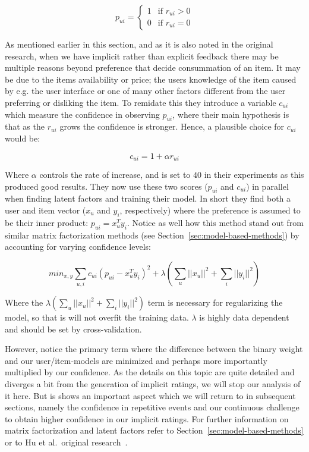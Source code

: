 \begin{equation}
  p_{ui} =
  \begin{cases}
    1 & \text{if $r_{ui} > 0$} \\
    0 & \text{if $r_{ui} = 0$}
  \end{cases}
\end{equation}

As mentioned earlier in this section, and as it is also noted in the original
research, when we have implicit rather than explicit feedback there may be
multiple reasons beyond preference that decide consummation of an item. It may
be due to the items availability or price; the users knowledge of the item
caused by e.g. the user interface or one of many other factors different from
the user preferring or disliking the item. To remidate this they introduce a
variable $c_{ui}$ which measure the confidence in observing $p_{ui}$, where
their main hypothesis is that as the $r_{ui}$ grows the confidence is stronger.
Hence, a plausible choice for $c_{ui}$ would be:

\begin{equation}
c_{ui} = 1 + \alpha r_{ui}
\end{equation}

Where $\alpha$ controls the rate of increase, and is set to $40$ in their
experiments as this produced good results. They now use these two scores
($p_{ui}$ and $c_{ui}$) in parallel when finding latent factors and training
their model. In short they find both a user and item vector ($x_u$ and $y_i$,
respectively) where the preference is assumed to be their inner product: $p_{ui}
= x_{u}^{T} y_{i}$. Notice as well how this method stand out from similar
matrix factorization methods (see Section~\ref{sec:model-based-methods}) by
accounting for varying confidence levels:

\begin{equation}
  min_{x,y} \sum _{u,i} c_{ui} (p_{ui} - x_{u}^{T} y_i)^2 + \lambda (\sum _{u}
  || x_u ||^2 + \sum_{i} || y_i ||^2)
\end{equation}

Where the $\lambda (\sum _{u} || x_u ||^2 + \sum_{i} || y_i ||^2)$ term is
necessary for regularizing the model, so that is will not overfit the
training data. $\lambda$ is highly data dependent and should be set by
cross-validation.

However, notice the primary term where the difference between the binary weight
and our user/item-models are minimized and perhaps more importantly multiplied
by our confidence. As the details on this topic are quite detailed and diverges
a bit from the generation of implicit ratings, we will stop our analysis of it
here. But is shows an important aspect which we will return to in subsequent
sections, namely the confidence in repetitive events and our continuous
challenge to obtain higher confidence in our implicit ratings. For further
information on matrix factorization and latent factors refer to
Section~\ref{sec:model-based-methods} or to Hu et al.\ original
research~\cite{Hu2008}.

